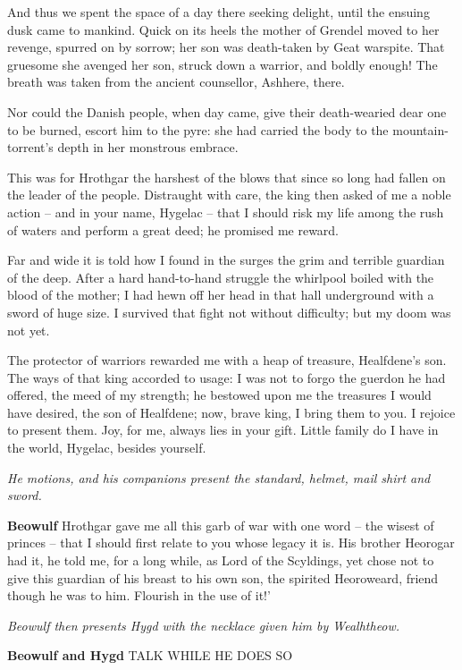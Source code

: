\documentclass[a4paper]{article}
\begin{document}
{And thus we spent the space of a day there
seeking delight, until the ensuing dusk
came to mankind. Quick on its heels
the mother of Grendel moved to her revenge,
spurred on by sorrow; her son was death-taken
by Geat warspite. That gruesome she
avenged her son, struck down a warrior,
and boldly enough! The breath was taken
from the ancient counsellor, Ashhere, there.

Nor could the Danish people, when day came,
give their death-wearied dear one to be burned,
escort him to the pyre: she had carried the body
to the mountain-torrent’s depth in her monstrous embrace.

This was for Hrothgar the harshest of the blows
that since so long had fallen on the leader of the people.
Distraught with care, the king then asked of me
a noble action – and in your name, Hygelac –
that I should risk my life among the rush of waters
and perform a great deed; he promised me reward.

Far and wide it is told how I found in the surges
the grim and terrible guardian of the deep.
After a hard hand-to-hand struggle
the whirlpool boiled with the blood of the mother;
I had hewn off her head in that hall underground
with a sword of huge size. I survived that fight
not without difficulty; but my doom was not yet.

The protector of warriors rewarded me
with a heap of treasure, Healfdene’s son.
The ways of that king accorded to usage:
I was not to forgo the guerdon he had offered,
the meed of my strength; he bestowed upon me
the treasures I would have desired, the son of Healfdene;
now, brave king, I bring them to you.
I rejoice to present them. Joy, for me, always
lies in your gift. Little family
do I have in the world, Hygelac, besides yourself.

\centerline{\textit{He motions, and his companions present the standard, helmet, mail shirt and sword.}}

\textbf{Beowulf} Hrothgar gave me all this garb of war
with one word – the wisest of princes –
that I should first relate to you whose legacy it is.
His brother Heorogar had it, he told me,
for a long while, as Lord of the Scyldings,
yet chose not to give this guardian of his breast
to his own son, the spirited Heoroweard,
friend though he was to him.
Flourish in the use of it!’

\centerline{\textit{Beowulf then presents Hygd with the necklace given him by Wealhtheow.}}

\textbf{Beowulf and Hygd} TALK WHILE HE DOES SO

}
\end{document}
